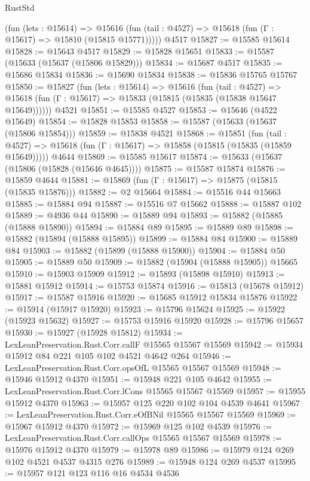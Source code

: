 \begin{lexlean}{RustStd}
\begin{coremodule}
      (fun (lets : @15614) =>
      @15616 (fun (tail : @4527) => @15618 (fun (Γ : @15617) => @15810 (@15815 @15771)))))
    @4517
@15827 := @15585 @15614
@15828 := @15643 @4517
@15829 := @15828 @15651
@15833 := @15587 (@15633 (@15637 (@15806 @15829)))
@15834 := @15687 @4517
@15835 := @15686 @15834
@15836 := @15690 @15834
@15838 := @15836 @15765 @15767
@15850 := @15827
    (fun (lets : @15614) =>
    @15616
      (fun (tail : @4527) =>
      @15618 (fun (Γ : @15617) => @15833 (@15815 (@15835 (@15838 @15647 @15649))))))
    @4521
@15851 := @15585 @4527
@15853 := @15646 (@4522 @15649)
@15854 := @15828 @15853
@15858 := @15587 (@15633 (@15637 (@15806 @15854)))
@15859 := @15838 @4521
@15868 := @15851
    (fun (tail : @4527) => @15618 (fun (Γ : @15617) => @15858 (@15815 (@15835 (@15859 @15649)))))
    @4644
@15869 := @15585 @15617
@15874 := @15633 (@15637 (@15806 (@15828 (@15646 @4645))))
@15875 := @15587 @15874
@15876 := @15859 @4644
@15881 := @15869 (fun (Γ : @15617) => @15875 (@15815 (@15835 @15876)))
@15882 := @2 @15664
@15884 := @15516 @44 @15663
@15885 := @15884 @94
@15887 := @15516 @7 @15662
@15888 := @15887 @102
@15889 := @4936 @44
@15890 := @15889 @94
@15893 := @15882 (@15885 (@15888 @15890))
@15894 := @15884 @89
@15895 := @15889 @89
@15898 := @15882 (@15894 (@15888 @15895))
@15899 := @15884 @84
@15900 := @15889 @84
@15903 := @15882 (@15899 (@15888 @15900))
@15904 := @15884 @50
@15905 := @15889 @50
@15909 := @15882 (@15904 (@15888 @15905)) @15665
@15910 := @15903 @15909
@15912 := @15893 (@15898 @15910)
@15913 := @15881 @15912
@15914 := @15753 @15874
@15916 := @15813 (@15678 @15912)
@15917 := @15587 @15916
@15920 := @15685 @15912 @15834 @15876
@15922 := @15914 (@15917 @15920)
@15923 := @15796 @15624
@15925 := @15922 (@15923 @15632)
@15927 := @15753 @15916 @15920
@15928 := @15796 @15657
@15930 := @15927 (@15928 @15812)
@15934 := LexLeanPreservation.Rust.Corr.callF @15565 @15567 @15569
@15942 := @15934 @15912 @84 @221 @105 @102 @4521 @4642 @264
@15946 := LexLeanPreservation.Rust.Corr.opsOfL @15565 @15567 @15569
@15948 := @15946 @15912 @4370
@15951 := @15948 @221 @105 @4642
@15955 := LexLeanPreservation.Rust.Corr.lCons @15565 @15567 @15569
@15957 := @15955 @15912 @4370
@15963 := @15957 @125 @220 @102 @104 @4539 @4641
@15967 := LexLeanPreservation.Rust.Corr.eOfBNil @15565 @15567 @15569
@15969 := @15967 @15912 @4370
@15972 := @15969 @125 @102 @4539
@15976 := LexLeanPreservation.Rust.Corr.callOps @15565 @15567 @15569
@15978 := @15976 @15912 @4370
@15979 := @15978 @89
@15986 := @15979 @124 @269 @102 @4521 @4537 @4315 @276
@15989 := @15948 @124 @269 @4537
@15995 := @15957 @121 @123 @116 @16 @4534 @4536

\end{coremodule}
\end{lexlean}
